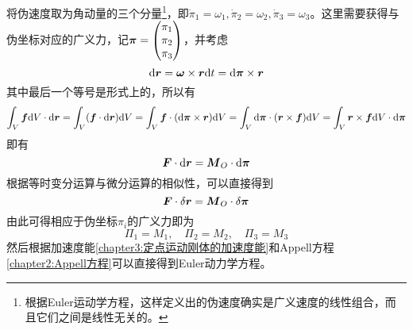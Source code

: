 \begin{example}[利用Appell方程获得Euler动力学方程]
将伪速度取为角动量的三个分量\footnote{根据Euler运动学方程，这样定义出的伪速度确实是广义速度的线性组合，而且它们之间是线性无关的。}，即$\dot{\pi}_1=\omega_1, \dot{\pi}_2=\omega_2, \dot{\pi}_3=\omega_3$。这里需要获得与伪坐标对应的广义力，记$\boldsymbol{\pi} = \begin{pmatrix} \pi_1 \\ \pi_2 \\ \pi_3 \end{pmatrix}$，并考虑
\begin{equation*}
	\mathrm{d} \boldsymbol{r} = \boldsymbol{\omega}\times \boldsymbol{r}\mathrm{d} t = \mathrm{d} \boldsymbol{\pi} \times \boldsymbol{r}
\end{equation*}
其中最后一个等号是形式上的，所以有
\begin{equation*}
	\int_V \boldsymbol{f} \mathrm{d} V\cdot \mathrm{d} \boldsymbol{r} = \int_V (\boldsymbol{f}\cdot \mathrm{d} \boldsymbol{r}) \mathrm{d} V = \int_V \boldsymbol{f}\cdot (\mathrm{d} \boldsymbol{\pi} \times \boldsymbol{r}) \mathrm{d} V = \int_V \mathrm{d} \boldsymbol{\pi} \cdot (\boldsymbol{r}\times \boldsymbol{f})\mathrm{d} V = \int_V \boldsymbol{r}\times \boldsymbol{f}\mathrm{d} V \cdot \mathrm{d} \boldsymbol{\pi}
\end{equation*}
即有
\begin{equation*}
	\boldsymbol{F} \cdot \mathrm{d} \boldsymbol{r} = \boldsymbol{M}_O \cdot \mathrm{d} \boldsymbol{\pi}
\end{equation*}
根据等时变分运算与微分运算的相似性，可以直接得到
\begin{equation*}
	\boldsymbol{F}\cdot \delta\boldsymbol{r} = \boldsymbol{M}_O\cdot \delta \boldsymbol{\pi}
\end{equation*}
由此可得相应于伪坐标$\pi_i$的广义力即为
\begin{equation*}
	\varPi_1 = M_1,\quad \varPi_2 = M_2,\quad \varPi_3 = M_3
\end{equation*}
然后根据加速度能\eqref{chapter3:定点运动刚体的加速度能}和Appell方程\eqref{chapter2:Appell方程}可以直接得到Euler动力学方程。
\end{example}

